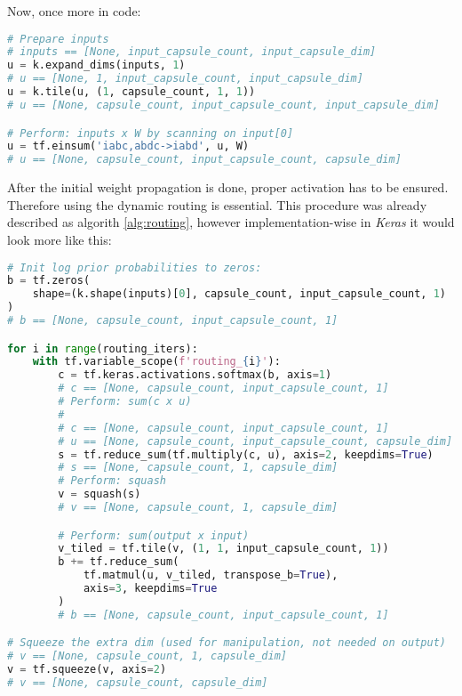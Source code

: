 Now, once more in code:

\begin{lstlisting}[language=Python, caption=Prediction capsule call without routing]
# Prepare inputs
# inputs == [None, input_capsule_count, input_capsule_dim]
u = k.expand_dims(inputs, 1)
# u == [None, 1, input_capsule_count, input_capsule_dim]
u = k.tile(u, (1, capsule_count, 1, 1))
# u == [None, capsule_count, input_capsule_count, input_capsule_dim]

# Perform: inputs x W by scanning on input[0]
u = tf.einsum('iabc,abdc->iabd', u, W)
# u == [None, capsule_count, input_capsule_count, capsule_dim]
\end{lstlisting}

After the initial weight propagation is done, proper activation has to be ensured. Therefore using the dynamic routing is essential. This procedure was already described as algorith \ref{alg:routing}, however implementation-wise in \textit{Keras} it would look more like this:

\begin{lstlisting}[language=Python, caption=Prediction capsule routing]
# Init log prior probabilities to zeros:
b = tf.zeros(
    shape=(k.shape(inputs)[0], capsule_count, input_capsule_count, 1)
)
# b == [None, capsule_count, input_capsule_count, 1]

for i in range(routing_iters):
    with tf.variable_scope(f'routing_{i}'):
        c = tf.keras.activations.softmax(b, axis=1)
        # c == [None, capsule_count, input_capsule_count, 1]
        # Perform: sum(c x u)
        #
        # c == [None, capsule_count, input_capsule_count, 1]
        # u == [None, capsule_count, input_capsule_count, capsule_dim]
        s = tf.reduce_sum(tf.multiply(c, u), axis=2, keepdims=True)
        # s == [None, capsule_count, 1, capsule_dim]
        # Perform: squash
        v = squash(s)
        # v == [None, capsule_count, 1, capsule_dim]

        # Perform: sum(output x input)
        v_tiled = tf.tile(v, (1, 1, input_capsule_count, 1))
        b += tf.reduce_sum(
            tf.matmul(u, v_tiled, transpose_b=True),
            axis=3, keepdims=True
        )
        # b == [None, capsule_count, input_capsule_count, 1]

# Squeeze the extra dim (used for manipulation, not needed on output)
# v == [None, capsule_count, 1, capsule_dim]
v = tf.squeeze(v, axis=2)
# v == [None, capsule_count, capsule_dim]
\end{lstlisting}

